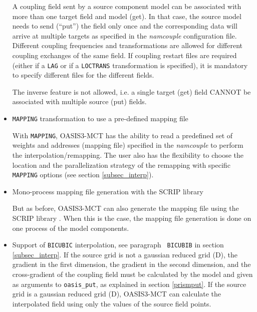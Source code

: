 \begin{itemize}
  A coupling field sent by a source component model can be associated
  with more than one target field and model (get). In that case, the
  source model needs to send (``put'') the field only once and the
  corresponding data will arrive at multiple targets as specified in
  the {\it namcouple} configuration file. Different coupling
  frequencies and transformations are allowed for different coupling
  exchanges of the same field. If coupling restart files are required
  (either if a {\tt LAG} or if a {\tt LOCTRANS} transformation is
  specified), it is mandatory to specify different files for the
  different fields.

The inverse feature is not allowed, i.e. a single target (get) field
CANNOT be associated with multiple source (put) fields.

\item {\tt MAPPING} transformation to use a pre-defined mapping file

With {\tt MAPPING}, OASIS3-MCT has the ability to read a predefined
set of weights and addresses (mapping file) specified in the {\it
  namcouple} to perform the interpolation/remapping. The user also has
the flexibility to choose the location and the parallelization strategy of the
remapping with specific {\tt MAPPING} options (see section \ref{subsec_interp}).

\item Mono-process mapping file generation with the SCRIP library

But as before, OASIS3-MCT can
also generate the mapping file using the SCRIP library
\citep{Jones99}. When this is the case, the mapping file generation is
done on one process of the model components.

\item Support of {\tt BICUBIC} interpolation, see paragraph {\tt
    BICUBIB} in section \ref{subsec_interp}. If the source grid
    is not a gaussian reduced grid (D), the gradient in the first dimension, 
    the gradient in the second dimension, and the cross-gradient 
    of the coupling field must be calculated by the model and 
    given as arguments to {\tt oasis\_put}, as explained in section \ref{prismput}.
    If the source grid is a gaussian reduced grid (D), OASIS3-MCT 
    can calculate the interpolated field using only the values of the source
    field points.


\end{itemize}

